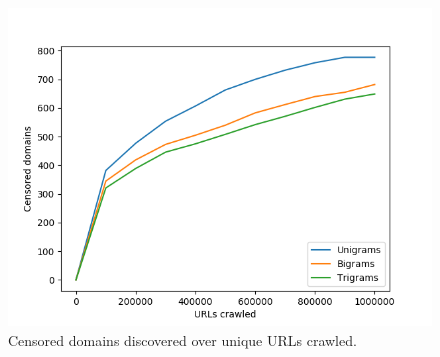 \begin{figure}[t]
  \centering
  \includegraphics[scale=0.5]{figures/urls-crawled}
  \caption{\label{censored-vs-urls} Censored domains discovered over unique URLs crawled. }
\end{figure}

